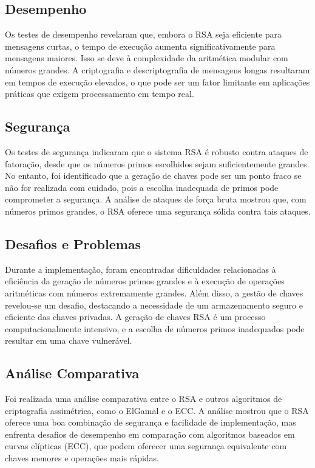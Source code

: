 \documentclass[a4paper,12pt]{article}
\begin{document}
\subsection*{Desempenho}
Os testes de desempenho revelaram que, embora o RSA seja eficiente para mensagens curtas, o tempo de execução aumenta significativamente para mensagens maiores. Isso se deve à complexidade da aritmética modular com números grandes. A criptografia e descriptografia de mensagens longas resultaram em tempos de execução elevados, o que pode ser um fator limitante em aplicações práticas que exigem processamento em tempo real.

\subsection*{Segurança}
Os testes de segurança indicaram que o sistema RSA é robusto contra ataques de fatoração, desde que os números primos escolhidos sejam suficientemente grandes. No entanto, foi identificado que a geração de chaves pode ser um ponto fraco se não for realizada com cuidado, pois a escolha inadequada de primos pode comprometer a segurança. A análise de ataques de força bruta mostrou que, com números primos grandes, o RSA oferece uma segurança sólida contra tais ataques.

\subsection*{Desafios e Problemas}
Durante a implementação, foram encontradas dificuldades relacionadas à eficiência da geração de números primos grandes e à execução de operações aritméticas com números extremamente grandes. Além disso, a gestão de chaves revelou-se um desafio, destacando a necessidade de um armazenamento seguro e eficiente das chaves privadas. A geração de chaves RSA é um processo computacionalmente intensivo, e a escolha de números primos inadequados pode resultar em uma chave vulnerável.

\subsection*{Análise Comparativa}
Foi realizada uma análise comparativa entre o RSA e outros algoritmos de criptografia assimétrica, como o ElGamal e o ECC. A análise mostrou que o RSA oferece uma boa combinação de segurança e facilidade de implementação, mas enfrenta desafios de desempenho em comparação com algoritmos baseados em curvas elípticas (ECC), que podem oferecer uma segurança equivalente com chaves menores e operações mais rápidas.
\end{document}

